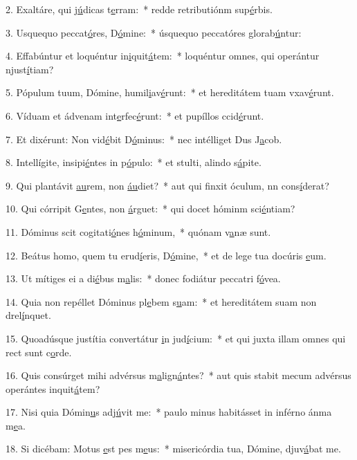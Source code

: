 2. Exaltáre, qui j\uline{ú}dicas t\uline{e}rram:~* redde retributiónm sup\uline{é}rbis.\par 
3. Usquequo peccat\uline{ó}res, D\uline{ó}mine:~* úsquequo peccatóres glorab\uline{ú}ntur:\par 
4. Effabúntur et loquéntur in\uline{i}quit\uline{á}tem:~* loquéntur omnes, qui operántur njust\uline{í}tiam?\par 
5. Pópulum tuum, Dómine, humil\uline{i}av\uline{é}runt:~* et hereditátem tuam vxav\uline{é}runt.\par 
6. Víduam et ádvenam int\uline{e}rfec\uline{é}runt:~* et pupíllos ccid\uline{é}runt.\par 
7. Et dixérunt: Non vid\uline{é}bit D\uline{ó}minus:~* nec intélliget Dus J\uline{a}cob.\par 
8. Intellígite, insipi\uline{é}ntes in p\uline{ó}pulo:~* et stulti, alindo s\uline{á}pite.\par 
9. Qui plantávit \uline{au}rem, non \uline{áu}diet?~* aut qui finxit óculum, nn cons\uline{í}derat?\par 
10. Qui córripit G\uline{e}ntes, non \uline{á}rguet:~* qui docet hóminm sci\uline{é}ntiam?\par 
11. Dóminus scit cogitati\uline{ó}nes h\uline{ó}minum,~* quónam v\uline{a}næ sunt.\par 
12. Beátus homo, quem tu erud\uline{í}eris, D\uline{ó}mine,~* et de lege tua docúris \uline{e}um.\par 
13. Ut mítiges ei a di\uline{é}bus m\uline{a}lis:~* donec fodiátur peccatri f\uline{ó}vea.\par 
14. Quia non repéllet Dóminus pl\uline{e}bem s\uline{u}am:~* et hereditátem suam non drel\uline{í}nquet.\par 
15. Quoadúsque justítia convertátur \uline{i}n jud\uline{í}cium:~* et qui juxta illam omnes qui rect sunt c\uline{o}rde.\par 
16. Quis consúrget mihi advérsus m\uline{a}lign\uline{á}ntes?~* aut quis stabit mecum advérsus operántes inquit\uline{á}tem?\par 
17. Nisi quia Dómin\uline{u}s adj\uline{ú}vit me:~* paulo minus habitásset in inférno ánma m\uline{e}a.\par 
18. Si dicébam: Motus \uline{e}st pes m\uline{e}us:~* misericórdia tua, Dómine, djuv\uline{á}bat me.\par 
